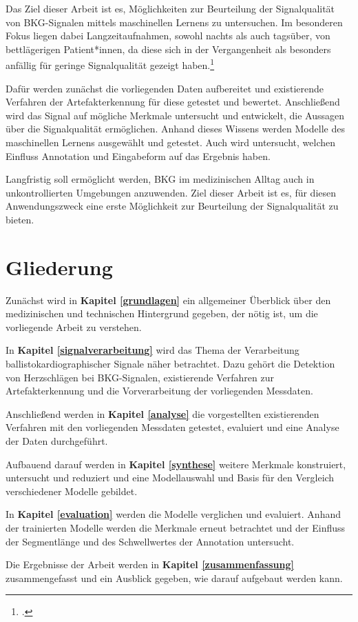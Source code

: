 Das Ziel dieser Arbeit ist es, Möglichkeiten zur Beurteilung der Signalqualität von \ac{BKG}-Signalen mittels maschinellen Lernens zu untersuchen. Im besonderen Fokus liegen dabei Langzeitaufnahmen, sowohl nachts als auch tagsüber, von bettlägerigen Patient*innen, da diese sich in der Vergangenheit als besonders anfällig für geringe Signalqualität gezeigt haben.\footcite{HoogAntink2020}

Dafür werden zunächst die vorliegenden Daten aufbereitet und existierende Verfahren der Artefakterkennung für diese getestet und bewertet. Anschließend wird das Signal auf mögliche Merkmale untersucht und entwickelt, die Aussagen über die Signalqualität ermöglichen. Anhand dieses Wissens werden Modelle des maschinellen Lernens ausgewählt und getestet. Auch wird untersucht, welchen Einfluss Annotation und Eingabeform auf das Ergebnis haben.

Langfristig soll ermöglicht werden, \acf{BKG} im medizinischen Alltag auch in unkontrollierten Umgebungen anzuwenden. Ziel dieser Arbeit ist es, für diesen Anwendungszweck eine erste Möglichkeit zur Beurteilung der Signalqualität zu bieten.%

\section{Gliederung}

Zunächst wird in \textbf{Kapitel \ref{grundlagen}} ein allgemeiner Überblick über den medizinischen und technischen Hintergrund gegeben, der nötig ist, um die vorliegende Arbeit zu verstehen.

In \textbf{Kapitel \ref{signalverarbeitung}} wird das Thema der Verarbeitung ballistokardiographischer Signale näher betrachtet. Dazu gehört die Detektion von Herzschlägen bei \ac{BKG}-Signalen, existierende Verfahren zur Artefakterkennung und die Vorverarbeitung der vorliegenden Messdaten.

Anschließend werden in \textbf{Kapitel \ref{analyse}} die vorgestellten existierenden Verfahren mit den vorliegenden Messdaten getestet, evaluiert und eine Analyse der Daten durchgeführt.

Aufbauend darauf werden in \textbf{Kapitel \ref{synthese}} weitere Merkmale konstruiert, untersucht und reduziert und eine Modellauswahl und Basis für den Vergleich verschiedener Modelle gebildet. %

In \textbf{Kapitel \ref{evaluation}} werden die Modelle verglichen und evaluiert. Anhand der trainierten Modelle werden die Merkmale erneut betrachtet und der Einfluss der Segmentlänge und des Schwellwertes der Annotation untersucht.

Die Ergebnisse der Arbeit werden in \textbf{Kapitel \ref{zusammenfassung}} zusammengefasst und ein Ausblick gegeben, wie darauf aufgebaut werden kann.